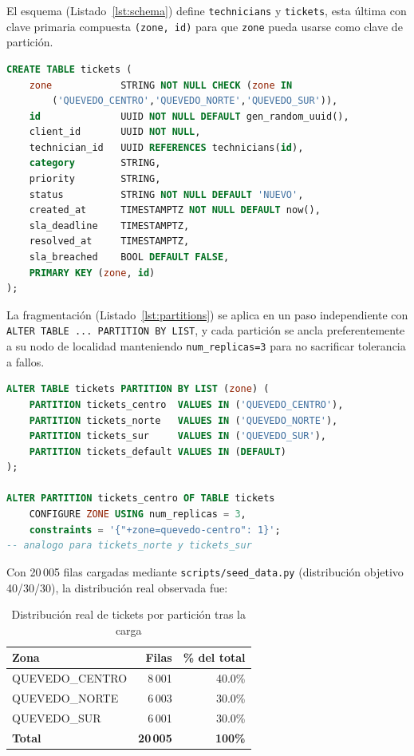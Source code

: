 \documentclass[11pt,a4paper]{article}
\begin{document}
El esquema (Listado~\ref{lst:schema}) define \texttt{technicians} y
\texttt{tickets}, esta última con clave primaria compuesta
\texttt{(zone, id)} para que \texttt{zone} pueda usarse como clave de
partición.

\begin{lstlisting}[language=SQL,caption={Fragmento de \texttt{sql/01\_schema.sql}: tabla principal del dominio},label={lst:schema}]
CREATE TABLE tickets (
    zone            STRING NOT NULL CHECK (zone IN
        ('QUEVEDO_CENTRO','QUEVEDO_NORTE','QUEVEDO_SUR')),
    id              UUID NOT NULL DEFAULT gen_random_uuid(),
    client_id       UUID NOT NULL,
    technician_id   UUID REFERENCES technicians(id),
    category        STRING,
    priority        STRING,
    status          STRING NOT NULL DEFAULT 'NUEVO',
    created_at      TIMESTAMPTZ NOT NULL DEFAULT now(),
    sla_deadline    TIMESTAMPTZ,
    resolved_at     TIMESTAMPTZ,
    sla_breached    BOOL DEFAULT FALSE,
    PRIMARY KEY (zone, id)
);
\end{lstlisting}

La fragmentación (Listado~\ref{lst:partitions}) se aplica en un paso
independiente con \texttt{ALTER TABLE ... PARTITION BY LIST}, y cada
partición se ancla preferentemente a su nodo de localidad manteniendo
\texttt{num\_replicas=3} para no sacrificar tolerancia a fallos.

\begin{lstlisting}[language=SQL,caption={\texttt{sql/02\_partitions.sql}: fragmentación horizontal y política de zona},label={lst:partitions}]
ALTER TABLE tickets PARTITION BY LIST (zone) (
    PARTITION tickets_centro  VALUES IN ('QUEVEDO_CENTRO'),
    PARTITION tickets_norte   VALUES IN ('QUEVEDO_NORTE'),
    PARTITION tickets_sur     VALUES IN ('QUEVEDO_SUR'),
    PARTITION tickets_default VALUES IN (DEFAULT)
);

ALTER PARTITION tickets_centro OF TABLE tickets
    CONFIGURE ZONE USING num_replicas = 3,
    constraints = '{"+zone=quevedo-centro": 1}';
-- analogo para tickets_norte y tickets_sur
\end{lstlisting}

Con 20\,005 filas cargadas mediante \texttt{scripts/seed\_data.py}
(distribución objetivo 40/30/30), la distribución real observada fue:

\begin{table}[H]
\centering
\caption{Distribución real de tickets por partición tras la carga}
\label{tab:distribucion}
\begin{tabular}{@{}lrr@{}}
\toprule
Zona & Filas & \% del total \\
\midrule
QUEVEDO\_CENTRO & 8\,001 & 40.0\% \\
QUEVEDO\_NORTE  & 6\,003 & 30.0\% \\
QUEVEDO\_SUR    & 6\,001 & 30.0\% \\
\midrule
\textbf{Total} & \textbf{20\,005} & \textbf{100\%} \\
\bottomrule
\end{tabular}
\end{table}
\end{document}
